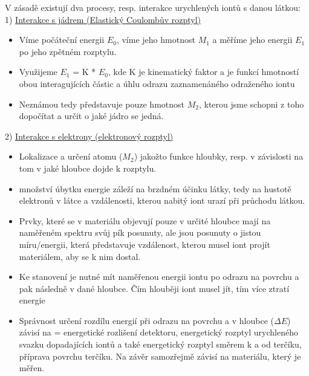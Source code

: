 V zásadě existují dva procesy, resp. interakce urychlených iontů s danou látkou:\\

1) \underline{Interakce s jádrem (Elastický Coulombův rozptyl) }
\begin{itemize}
    \item Víme počáteční energii $E_0$, víme jeho hmotnost $M_1$ a měříme jeho energii $E_1$ po jeho zpětném rozptylu.
    \item Využijeme $E_1$ = K * $E_0$, kde K je kinematický faktor a je funkcí hmotností obou interagujících částic a úhlu odrazu zaznamenáného odraženého iontu
    \item Neznámou tedy představuje pouze hmotnost $M_2$, kterou jsme schopni z toho dopočítat a určit o jaké jádro se jedná.
\end{itemize}

2) \underline{Interakce s elektrony (elektronový rozptyl)}
\begin{itemize}
    \item Lokalizace a určení atomu ($M_2$) jakožto funkce hloubky, resp. v závislosti na tom v jaké hloubce dojde k rozptylu.
    \item množství úbytku energie záleží na brzdném účinku látky, tedy na hustotě elektronů v látce a vzdálenosti, kterou nabitý iont urazí při průchodu látkou.
    \item Prvky, které se v materiálu objevují pouze v určité hloubce mají na naměřeném spektru svůj pík posunuty, ale jsou posunuty o jistou míru/energii, která představuje vzdálenost, kterou musel iont projít materiálem, aby se k nim dostal.
    \item Ke stanovení je nutné mít naměřenou energii iontu po odrazu na povrchu a pak následně v dané hloubce. Čím hlouběji iont musel jít, tím více ztratí energie
    \item Správnost určení rozdílu energií při odrazu na povrchu a v hloubce ($\Delta E$) závisí na = energetické rozlišení detektoru, energetický rozptyl urychleného svazku dopadajících iontů a také energetický rozptyl směrem k a od terčíku, příprava povrchu terčíku. Na závěr samozřejmě závisí na materiálu, který je měřen.
\end{itemize}

